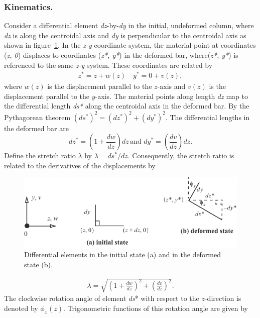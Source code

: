 \documentclass{AeroStructure-ERJohnson}
\begin{document}
\subsubsection{Kinematics.} Consider a differential element \textit{dz}-by-\textit{dy} in the initial, undeformed column, where \textit{dz} is along the centroidal axis and \textit{dy} is perpendicular to the centroidal axis as shown in figure~\ref{fig11.2}. In the \textit{z-y} coordinate system, the material point at coordinates (\textit{z, 0}) displaces to coordinates (\textit{z*, y*}) in the deformed bar, where\break (\textit{z*, y*}) is referenced to the same \textit{z-y} system. These coordinates are related by
\begin{align}\label{eq11.1}
 z^{*}=z+w(z) \quad y^{*}=0+v(z) ,
\end{align}
where $w(z)$ is the displacement parallel to the $z$-axis and $ v(z) $ is the displacement parallel to the $y$-axis. The material points along length \textit{dz} map to the differential length \textit{ds*} along the centroidal axis in the deformed bar. By the Pythagorean theorem $ \left(d s^{*}\right)^{2}=\left(d z^{*}\right)^{2}+\left(d y^{*}\right)^{2} $. The differential lengths in the deformed bar are
\begin{equation}
d z^{*}=\left(1+\frac{d w}{d z}\right) d z\,\textrm{and } d y^{*}=\left(\frac{d v}{d z}\right) d z. \label{eq11.2}
\end{equation}
Define the stretch ratio $\lambda$ by $\lambda=d s^{*}/dz$. Consequently, the stretch ratio is related to the derivatives of the displacements by
\begin{figure}[!h]
\centerline{\includegraphics{Figure_11-2.pdf}}
\caption{Differential elements in the initial state (a) and in the deformed state (b).} \label{fig11.2}
\end{figure}
\begin{align}\label{eq11.3}
 \lambda=\sqrt{\left(1+\frac{d w}{d z}\right)^{2}+\left(\frac{d v}{d z}\right)^{2}}.
\end{align}
The clockwise rotation angle of element \textit{ds}* with respect to the $z$-direction is denoted by $ \phi_{x}(z) $. Trigonometric functions of this rotation angle are given by
\end{document}
